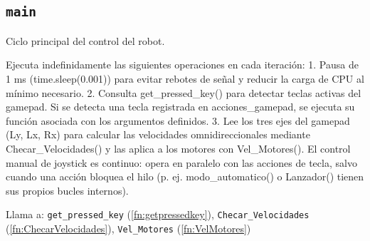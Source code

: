 
\subsection{\texttt{main}}
\label{fn:main}
Ciclo principal del control del robot.

Ejecuta indefinidamente las siguientes operaciones en cada iteración: 1. Pausa de 1 ms (time.sleep(0.001)) para evitar rebotes de señal y reducir la carga de CPU al mínimo necesario. 2. Consulta get\_pressed\_key() para detectar teclas activas del gamepad. Si se detecta una tecla registrada en acciones\_gamepad, se ejecuta su función asociada con los argumentos definidos. 3. Lee los tres ejes del gamepad (Ly, Lx, Rx) para calcular las velocidades omnidireccionales mediante Checar\_Velocidades() y las aplica a los motores con Vel\_Motores(). El control manual de joystick es continuo: opera en paralelo con las acciones de tecla, salvo cuando una acción bloquea el hilo (p. ej. modo\_automatico() o Lanzador() tienen sus propios bucles internos).

Llama a: \texttt{get\_pressed\_key} (\ref{fn:getpressedkey}), \texttt{Checar\_Velocidades} (\ref{fn:ChecarVelocidades}), \texttt{Vel\_Motores} (\ref{fn:VelMotores})\\

